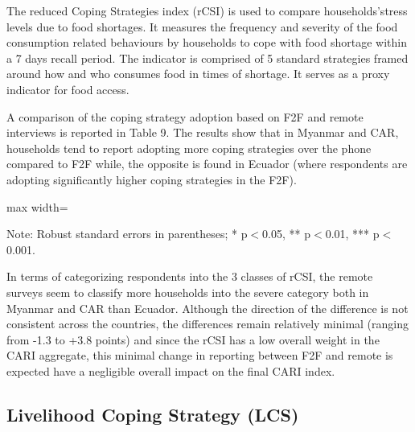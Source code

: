 \documentclass[11pt,harvard]{article}
\begin{document}
The reduced Coping Strategies index (rCSI) is used to compare households’stress  levels due to food shortages. It measures the frequency and severity of the food consumption related behaviours by households to cope with food shortage within a 7 days recall period. The indicator is comprised of 5 standard strategies framed around how and who consumes food in times of shortage. It serves as a proxy indicator for food access.

A comparison of the coping strategy adoption based on F2F and remote interviews is reported in Table 9. The results show that in Myanmar and CAR, households tend to report adopting more  coping strategies over the phone compared to F2F while, the opposite is found in Ecuador (where respondents are adopting significantly higher coping strategies in the F2F).
	
	\begin{table}[htbp]
		\centering
		\begin{adjustbox}{max width=\textwidth}
			\begin{threeparttable}
				\caption{Impact of Survey Modality on Reduced Coping Strategy Index Classification}
				\scriptsize
				 
				\label{tab:rCSI_Modality_All_Country}
				\begin{tablenotes}
					\item Note: Robust standard errors in parentheses; * p$<$0.05, ** p$<$0.01, *** p$<$0.001. 
				\end{tablenotes}
			\end{threeparttable}
		\end{adjustbox}
	\end{table}
	
In terms of categorizing respondents into the 3 classes of rCSI, the remote surveys seem to classify more households into the severe category both in Myanmar and CAR than Ecuador. Although the direction of the difference is not consistent across the countries, the differences remain relatively minimal (ranging from -1.3 to +3.8 points) and since the rCSI has a low overall weight in the CARI aggregate, this minimal change in reporting between F2F and remote is expected have a negligible overall impact on the final CARI index. 
	
	\pagebreak
	
\subsection{Livelihood Coping Strategy (LCS)}
	
\end{document}
